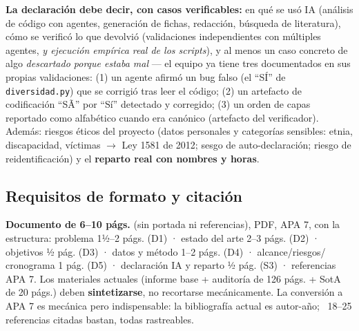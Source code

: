 \begin{tcolorbox}[nota]
\textbf{La declaración debe decir, con casos verificables:} en qué se usó IA
(análisis de código con agentes, generación de fichas, redacción, búsqueda de
literatura), cómo se verificó lo que devolvió (validaciones independientes con
múltiples agentes, \emph{y ejecución empírica real de los scripts}), y al menos
un caso concreto de algo \emph{descartado porque estaba mal} — el equipo ya
tiene tres documentados en sus propias validaciones: (1) un agente afirmó un
bug falso (el ``SÍ'' de \texttt{diversidad.py}) que se corrigió tras leer el
código; (2) un artefacto de codificación ``SÃ'' por ``Sí'' detectado y
corregido; (3) un orden de capas reportado como alfabético cuando era canónico
(artefacto del verificador). Además: riesgos éticos del proyecto (datos
personales y categorías sensibles: etnia, discapacidad, víctimas $\rightarrow$
Ley 1581 de 2012; sesgo de auto-declaración; riesgo de reidentificación) y el
\textbf{reparto real con nombres y horas}.
\end{tcolorbox}

\subsection{Requisitos de formato y citación}

\textbf{Documento de 6--10 págs.} (sin portada ni referencias), PDF, APA 7, con
la estructura: problema 1½--2 págs. (D1) · estado del arte 2--3 págs. (D2) ·
objetivos ½ pág. (D3) · datos y método 1--2 págs. (D4) · alcance/riesgos/
cronograma 1 pág. (D5) · declaración IA y reparto ½ pág. (S3) · referencias
APA 7. Los materiales actuales (informe base + auditoría de 126 págs. + SotA de
20 págs.) deben \textbf{sintetizarse}, no recortarse mecánicamente. La
conversión a APA 7 es mecánica pero indispensable: la bibliografía actual es
autor-año; ~18--25 referencias citadas bastan, todas rastreables.
